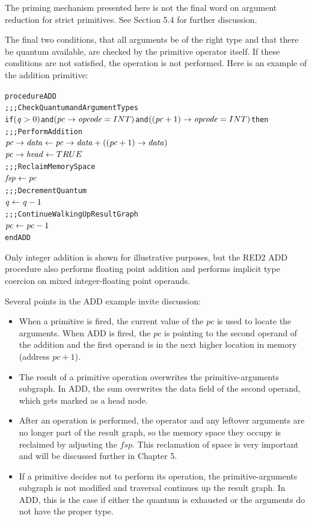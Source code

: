 The priming mechanism presented here is not the final word on argument reduction for
strict primitives. See Section 5.4 for further discussion.

The final two conditions, that all arguments be of the right type and that there be
quantum available, are checked by the primitive operator itself. If these conditions are
not satisfied, the operation is not performed. Here is an example of the addition
primitive:

\begin{alltt}
procedure ADD
  ;;; Check Quantum and Argument Types
  if \((\rt{q}>0)\) and \((\rtfield{pc}{opcode} = INT)\) and \(((\rt{pc}+1)\rightarrow\mathit{opcode} = INT)\) then
    ;;; Perform Addition
    \(\rtfield{pc}{data} \leftarrow \rtfield{pc}{data} + ((\rt{pc}+1)\rightarrow\mathit{data})\)
    \(\rtfield{pc}{head} \leftarrow TRUE\)
    ;;; Reclaim Memory Space
    \(\rt{fsp} \leftarrow \rt{pc}\)
    ;;; Decrement Quantum
    \(\rt{q} \leftarrow \rt{q}-1\)
  ;;; Continue Walking Up Result Graph
\(\rt{pc} \leftarrow \rt{pc}-1\)
end ADD
\end{alltt}


Only integer addition is shown for illustrative purposes, but the RED2 ADD procedure also
performs floating point addition and performs implicit type coercion on mixed
integer-floating point operands.

Several points in the ADD example invite discussion:

\begin{itemize}
\item When a primitive is fired, the current value of the \(pc\) is used to locate the
arguments. When ADD is fired, the \(pc\) is pointing to the second operand of the addition
and the first operand is in the next higher location in memory (address \(pc+1\)).

\item The result of a primitive operation overwrites the primitive-arguments subgraph. In
ADD, the sum overwrites the data field of the second operand, which gets marked as a head
node.

\item After an operation is performed, the operator and any leftover arguments are no
longer part of the result graph, so the memory space they occupy is reclaimed by adjusting
the \(fsp\). This reclamation of space is very important and will be discussed further in
Chapter 5.

\item If a primitive decides not to perform its operation, the primitive-arguments subgraph
is not modified and traversal continues up the result graph. In ADD, this is the case if
either the quantum is exhausted or the arguments do not have the proper type.
\end{itemize}


